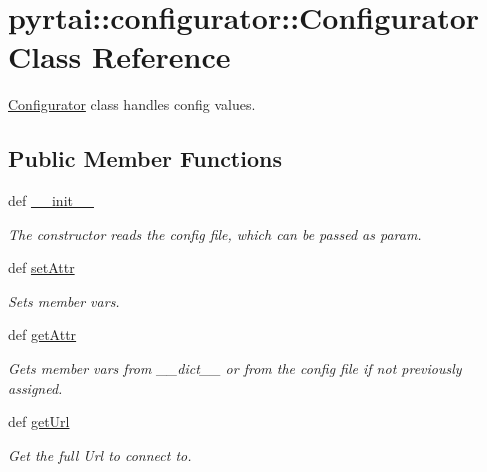 \hypertarget{classpyrtai_1_1configurator_1_1_configurator}{
\section{pyrtai\-:\-:configurator\-:\-:\-Configurator \-Class \-Reference}
\label{classpyrtai_1_1configurator_1_1_configurator}
}


\hyperlink{classpyrtai_1_1configurator_1_1_configurator}{\-Configurator} class handles config values.  


\subsection*{\-Public \-Member \-Functions}
\begin{DoxyCompactItemize}
\item 
def \hyperlink{classpyrtai_1_1configurator_1_1_configurator_ae3c0f806987595f13595605d21cb2631}{\-\_\-\-\_\-init\-\_\-\-\_\-}
\begin{DoxyCompactList}\small\item\em \-The constructor reads the config file, which can be passed as param. \end{DoxyCompactList}\item 
def \hyperlink{classpyrtai_1_1configurator_1_1_configurator_ac3a2ae60e843ca40da8b5d244b93ceab}{set\-Attr}
\begin{DoxyCompactList}\small\item\em \-Sets member vars. \end{DoxyCompactList}\item 
def \hyperlink{classpyrtai_1_1configurator_1_1_configurator_a74ab3f8a787c67efaad0e439f71ef685}{get\-Attr}
\begin{DoxyCompactList}\small\item\em \-Gets member vars from \-\_\-\-\_\-dict\-\_\-\-\_\- or from the config file if not previously assigned. \end{DoxyCompactList}\item 
def \hyperlink{classpyrtai_1_1configurator_1_1_configurator_a8e80cc32ad6606ce9b93ba6f91502892}{get\-Url}
\begin{DoxyCompactList}\small\item\em \-Get the full \-Url to connect to. \end{DoxyCompactList}\end{DoxyCompactItemize}
